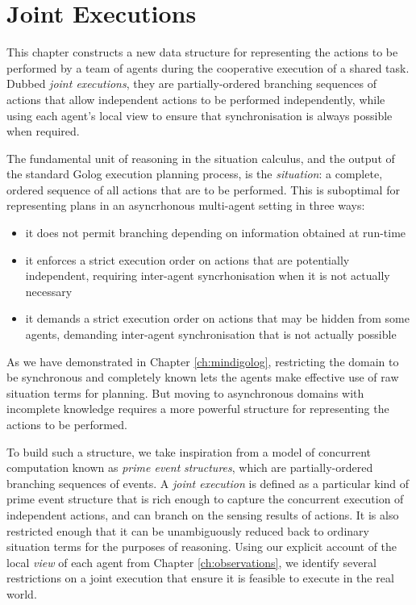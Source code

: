 

\chapter{Joint Executions}

\label{ch:jointexec}

This chapter constructs a new data structure for representing the
actions to be performed by a team of agents during the cooperative
execution of a shared task. Dubbed \emph{joint executions}, they are
partially-ordered branching sequences of actions that allow independent
actions to be performed independently, while using each agent's local
view to ensure that synchronisation is always possible when required.

The fundamental unit of reasoning in the situation calculus, and the
output of the standard Golog execution planning process, is the \emph{situation}:
a complete, ordered sequence of all actions that are to be performed.
This is suboptimal for representing plans in an asyncrhonous multi-agent
setting in three ways:

\begin{itemize}
\item it does not permit branching depending on information obtained at
run-time 
\item it enforces a strict execution order on actions that are potentially
independent, requiring inter-agent syncrhonisation when it is not
actually necessary 
\item it demands a strict execution order on actions that may be hidden
from some agents, demanding inter-agent synchronisation that is not
actually possible 
\end{itemize}
As we have demonstrated in Chapter \ref{ch:mindigolog}, restricting
the domain to be synchronous and completely known lets the agents
make effective use of raw situation terms for planning. But moving
to asynchronous domains with incomplete knowledge requires a more
powerful structure for representing the actions to be performed.

To build such a structure, we take inspiration from a model of concurrent
computation known as \emph{prime event} \emph{structures}, which are
partially-ordered branching sequences of events. A \emph{joint execution}
is defined as a particular kind of prime event structure that is rich
enough to capture the concurrent execution of independent actions,
and can branch on the sensing results of actions. It is also restricted
enough that it can be unambiguously reduced back to ordinary situation
terms for the purposes of reasoning. Using our explicit account of
the local \emph{view} of each agent from Chapter \ref{ch:observations},
we identify several restrictions on a joint execution that ensure
it is feasible to execute in the real world.

